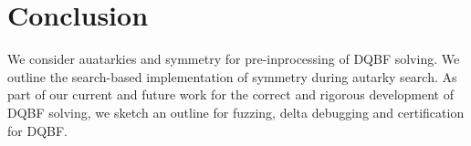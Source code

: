 \documentclass[conference]{IEEEtran}
\begin{document}

\section{Conclusion}
\label{sec:conc}

We consider auatarkies and symmetry for pre-inprocessing of DQBF solving.
%
We outline the search-based implementation of symmetry during autarky search.
%
As part of our current and future work for the correct and rigorous development of DQBF solving, we sketch an outline for fuzzing, delta debugging and certification for DQBF.


%
%


\end{document}
